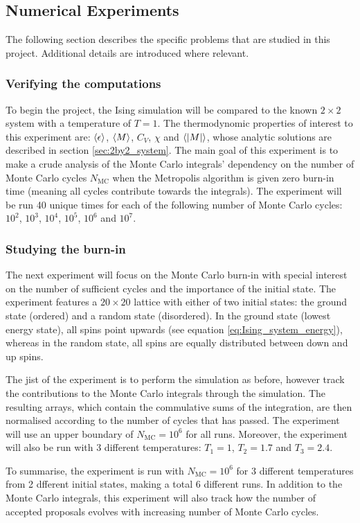 \documentclass[nofootinbib,reprint,english]{revtex4-1}
\begin{document}
\subsection{Numerical Experiments}
The following section describes the specific problems that are studied in this project. Additional details are introduced where relevant.
\subsubsection{Verifying the computations}
To begin the project, the Ising simulation will be compared to the known \(2\times2\) system with a temperature of \(T=1\). The thermodynomic properties of interest to this experiment are: \(\expval{\epsilon}\), \(\expval{M}\), \(C_V\), \(\chi\) and \(\expval{|M|}\), whose analytic solutions are described in section \ref{sec:2by2_system}. The main goal of this experiment is to make a crude analysis of the Monte Carlo integrals' dependency on the number of Monte Carlo cycles \(N_\text{MC}\) when the Metropolis algorithm is given zero burn-in time (meaning all cycles contribute towards the integrals). The experiment will be run 40 unique times for each of the following number of Monte Carlo cycles: \(10^2\), \(10^3\), \(10^4\), \(10^5\), \(10^6\) and \(10^7\).
\subsubsection{Studying the burn-in}
The next experiment will focus on the Monte Carlo burn-in with special interest on the number of sufficient cycles and the importance of the initial state. The experiment features a \(20\times20\) lattice with either of two initial states: the ground state (ordered) and a random state (disordered). In the ground state (lowest energy state), all spins point upwards (see equation \eqref{eq:Ising_system_energy}), whereas in the random state, all spins are equally distributed between down and up spins.

The jist of the experiment is to perform the simulation as before, however track the contributions to the Monte Carlo integrals through the simulation. The resulting arrays, which contain the commulative sums of the integration, are then normalised according to the number of cycles that has passed. The experiment will use an upper boundary of \(N_\text{MC}=10^6\) for all runs. Moreover, the experiment will also be run with 3 different temperatures: \(T_1=1\), \(T_2=1.7\) and \(T_3=2.4\).

To summarise, the experiment is run with \(N_\text{MC}=10^6\) for 3 different temperatures from 2 dfferent initial states, making a total 6 different runs. In addition to the Monte Carlo integrals, this experiment will also track how the number of accepted proposals evolves with increasing number of Monte Carlo cycles.
\end{document}
